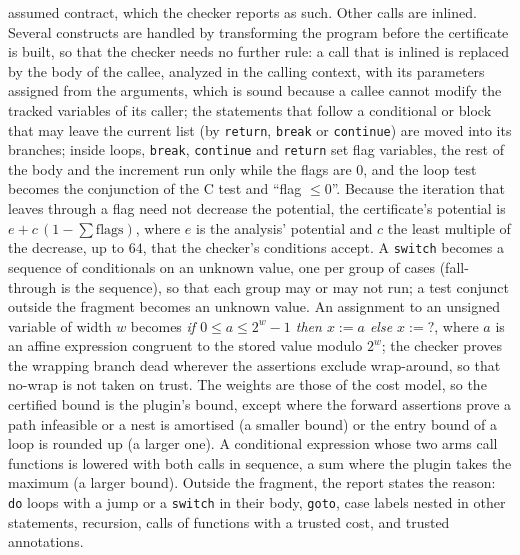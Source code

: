 \documentclass[oneside,english]{amsart}
\numberwithin{equation}{section}
\numberwithin{figure}{section}
\theoremstyle{plain}
\theoremstyle{definition}
\theoremstyle{plain}
\theoremstyle{remark}
\theoremstyle{plain}
\theoremstyle{definition}
\theoremstyle{plain}
\theoremstyle{remark}
\begin{document}
assumed contract, which the checker reports as such. Other calls are inlined. Several constructs are handled by transforming the program before the certificate is built, so that the checker needs no further rule: a call that is inlined is replaced by the body of the callee, analyzed in the calling context, with its parameters assigned from the arguments, which is sound because a callee cannot modify the tracked variables of its caller; the statements that follow a conditional or block that may leave the current list (by \texttt{return}, \texttt{break} or \texttt{continue}) are moved into its branches; inside loops, \texttt{break}, \texttt{continue} and \texttt{return} set flag variables, the rest of the body and the increment run only while the flags are $0$, and the loop test becomes the conjunction of the C test and ``flag $\le 0$''. Because the iteration that leaves through a flag need not decrease the potential, the certificate's potential is $e + c\,(1 - \sum \text{flags})$, where $e$ is the analysis' potential and $c$ the least multiple of the decrease, up to $64$, that the checker's conditions accept. A \texttt{switch} becomes a sequence of conditionals on an unknown value, one per group of cases (fall-through is the sequence), so that each group may or may not run; a test conjunct outside the fragment becomes an unknown value. An assignment to an unsigned variable of width $w$ becomes \emph{if $0 \le a \le 2^w - 1$ then $x := a$ else $x := {?}$}, where $a$ is an affine expression congruent to the stored value modulo $2^w$; the checker proves the wrapping branch dead wherever the assertions exclude wrap-around, so that no-wrap is not taken on trust. The weights are those of the cost model, so the certified bound is the plugin's bound, except where the forward assertions prove a path infeasible or a nest is amortised (a smaller bound) or the entry bound of a loop is rounded up (a larger one). A conditional expression whose two arms call functions is lowered with both calls in sequence, a sum where the plugin takes the maximum (a larger bound). Outside the fragment, the report states the reason: \texttt{do} loops with a jump or a \texttt{switch} in their body, \texttt{goto}, case labels nested in other statements, recursion, calls of functions with a trusted cost, and trusted annotations.
\end{document}
